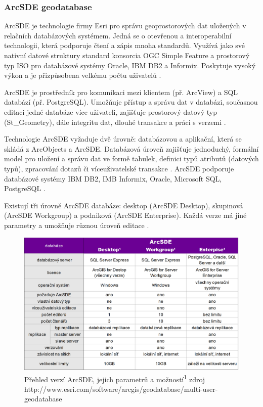         \subsubsection{ArcSDE geodatabase}
        \label{ArcSDE}
        ArcSDE je technologie firmy Esri pro správu geoprostorových dat uložených v
        relačních databázových systémem. Jedná se o otevřenou a interoperabilní
        technologii, která podporuje čtení a zápis mnoha standardů. Využívá jako své
        nativní datové struktury standard konsorcia OGC Simple Feature a prostorový typ
        ISO pro databázové systémy Oracle, IBM DB2 a Informix. Poskytuje vysoký výkon a
        je přizpůsobena velkému počtu uživatelů \citep{Esri2006}.

        ArcSDE je prostředník pro komunikaci mezi klientem (př. ArcView) a SQL databází
        (př. PostgreSQL). Umožňuje přístup a správu dat v databázi, současnou editaci
        jedné databáze více uživateli, zajišťuje prostorový datový typ (St\_Geometry),
        dále integritu dat, dlouhé transakce a práci s verzemi \citep{Law2008}.

        Technologie ArcSDE vyžaduje dvě úrovně: databázovou a aplikační, která se
        skládá z ArcObjects a ArcSDE. Databázová úroveň zajišťuje jednoduchý, formální
        model pro uložení a správu dat ve formě tabulek, definici typů atributů
        (datových typů), zpracování dotazů či víceuživatelské transakce
        \citep{Law2008}. ArcSDE podporuje databázové systémy IBM DB2, IMB Informix,
        Oracle, Microsoft SQL, PostgreSQL \citep{Esri2013a}.

        Existují tři úrovně ArcSDE databáze: desktop (ArcSDE Desktop), skupinová
        (ArcSDE Workgroup) a podniková (ArcSDE Enterprise). Každá verze má jiné
        parametry a umožňuje různou úroveň editace . 

        \begin{figure}[H]
            \centering
            \includegraphics[width=1\textwidth]{../../../grafy/obr/tabulka_ArcSDE_primo.png}
            \caption[Přehled verzí ArcSDE, jejich parametrů a možností]{Přehled verzí ArcSDE, jejich parametrů a možností\newline \textsuperscript{1} zdroj 
        http://www.esri.com/software/arcgis/geodatabase/multi-user-geodatabase}
            \label{sde}
          \end{figure}
        
